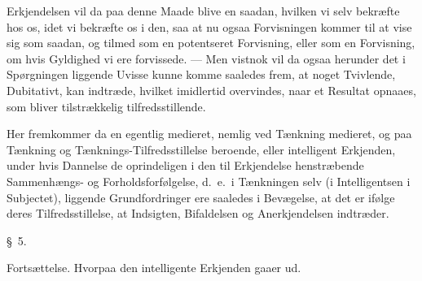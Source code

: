 \documentclass[12pt,a4paper]{book}
\begin{document}
Erkjendelsen vil da paa denne Maade blive en saadan, hvilken vi selv bekræfte hos
os, idet vi bekræfte os i den, saa at nu ogsaa Forvisningen kommer til at vise
sig som saadan, og tilmed som en potentseret Forvisning, eller som en Forvisning,
om hvis Gyldighed vi ere forvissede. --- Men vistnok vil da ogsaa herunder det i
Spørgningen liggende Uvisse kunne komme saaledes frem, at noget Tvivlende,
Dubitativt, kan indtræde, hvilket imidlertid overvindes, naar et Resultat
opnaaes, som bliver tilstrækkelig tilfredsstillende.

Her fremkommer da en egentlig medieret, nemlig ved Tænkning medieret, og paa
Tænkning og Tænknings-Tilfredsstillelse beroende, eller intelligent Erkjenden,
under hvis Dannelse de oprindeligen i den til Erkjendelse henstræbende
Sammenhængs- og Forholdsforfølgelse, d.\ e.\ i Tænkningen selv (i Intelligentsen
i Subjectet), liggende Grundfordringer ere saaledes i Bevægelse, at det er ifølge
deres Tilfredsstillelse, at Indsigten, Bifaldelsen og Anerkjendelsen indtræder.

\begin{center}\large\S~5.\end{center}
\begin{center}Fortsættelse. Hvorpaa den intelligente Erkjenden gaaer ud.\end{center}
\end{document}
